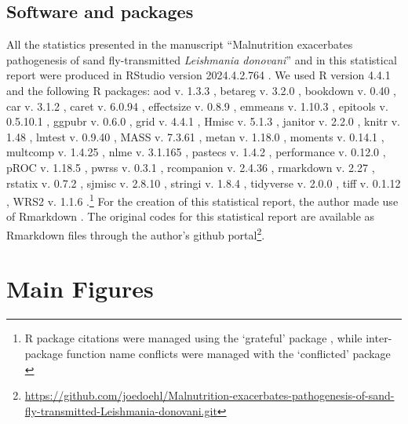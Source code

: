\documentclass[
  12pt,
  letterpaper,
]{article}
\DeclareRobustCommand{\href}[2]{#2\footnote{\url{#1}}}
\begin{document}
\subsection{Software and packages}\label{software-and-packages}

All the statistics presented in the manuscript ``Malnutrition exacerbates pathogenesis of sand fly-transmitted \emph{Leishmania donovani}'' and in this statistical report were produced in RStudio version 2024.4.2.764 \autocite{team2023}. We used R version 4.4.1 \autocite{base} and the following R packages: aod v. 1.3.3 \autocite{aod}, betareg v. 3.2.0 \autocite{betareg2010,betareg2012,betareg2024}, bookdown v. 0.40 \autocite{bookdown2016,bookdown2024}, car v. 3.1.2 \autocite{car}, caret v. 6.0.94 \autocite{caret}, effectsize v. 0.8.9 \autocite{effectsize}, emmeans v. 1.10.3 \autocite{emmeans}, epitools v. 0.5.10.1 \autocite{epitools}, ggpubr v. 0.6.0 \autocite{ggpubr}, grid v. 4.4.1 \autocite{grid}, Hmisc v. 5.1.3 \autocite{Hmisc}, janitor v. 2.2.0 \autocite{janitor}, knitr v. 1.48 \autocite{knitr2014,knitr2015,knitr2024}, lmtest v. 0.9.40 \autocite{lmtest}, MASS v. 7.3.61 \autocite{MASS}, metan v. 1.18.0 \autocite{metan}, moments v. 0.14.1 \autocite{moments}, multcomp v. 1.4.25 \autocite{multcomp}, nlme v. 3.1.165 \autocite{nlme2000,nlme2024}, pastecs v. 1.4.2 \autocite{pastecs}, performance v. 0.12.0 \autocite{performance}, pROC v. 1.18.5 \autocite{pROC}, pwrss v. 0.3.1 \autocite{pwrss}, rcompanion v. 2.4.36 \autocite{rcompanion}, rmarkdown v. 2.27 \autocite{rmarkdown2018,rmarkdown2020,rmarkdown2024}, rstatix v. 0.7.2 \autocite{rstatix}, sjmisc v. 2.8.10 \autocite{sjmisc}, stringi v. 1.8.4 \autocite{stringi}, tidyverse v. 2.0.0 \autocite{tidyverse}, tiff v. 0.1.12 \autocite{tiff}, WRS2 v. 1.1.6 \autocite{WRS2}.\footnote{R package citations were managed using the `grateful' package \autocite{grateful}, while inter-package function name conflicts were managed with the `conflicted' package \autocite{conflicted}} For the creation of this statistical report, the author made use of Rmarkdown \autocite{allaire2024}. The original codes for this statistical report are available as Rmarkdown files through the author's \href{https://github.com/joedoehl/Malnutrition-exacerbates-pathogenesis-of-sand-fly-transmitted-Leishmania-donovani.git}{github portal}.

\section{Main Figures}\label{main-figures}
\end{document}
